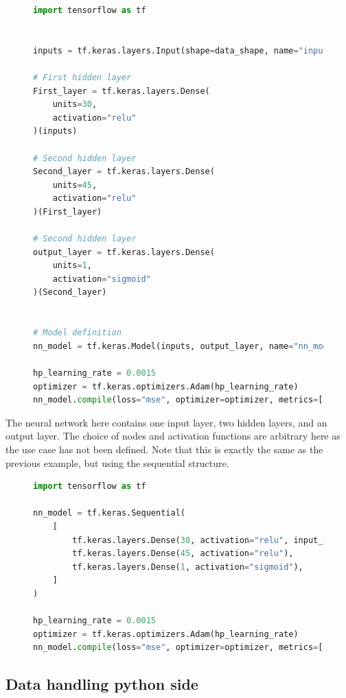 \begin{figure}[H]
    \centering
\begin{lstlisting}[language=Python, style=pythonstyle, label={code:python_func_example_general}]
import tensorflow as tf


inputs = tf.keras.layers.Input(shape=data_shape, name="input")

# First hidden layer
First_layer = tf.keras.layers.Dense(
    units=30,
    activation="relu"
)(inputs)

# Second hidden layer
Second_layer = tf.keras.layers.Dense(
    units=45, 
    activation="relu"
)(First_layer)

# Second hidden layer
output_layer = tf.keras.layers.Dense(
    units=1, 
    activation="sigmoid"
)(Second_layer)


# Model definition
nn_model = tf.keras.Model(inputs, output_layer, name="nn_model")

hp_learning_rate = 0.0015
optimizer = tf.keras.optimizers.Adam(hp_learning_rate)
nn_model.compile(loss="mse", optimizer=optimizer, metrics=["mse"]) 
\end{lstlisting}
\end{figure}
The neural network here contains one input layer, two hidden layers, and an output layer. The choice of nodes and activation functions are 
arbitrary here as the use case has not been defined. Note that this is exactly the same as the previous example, but using the sequential structure.

\begin{figure}[H]
    \centering
\begin{lstlisting}[language=Python, style=pythonstyle, label={code:python_seq_example}]
import tensorflow as tf

nn_model = tf.keras.Sequential(
    [
        tf.keras.layers.Dense(30, activation="relu", input_shape=data_shape),
        tf.keras.layers.Dense(45, activation="relu"),
        tf.keras.layers.Dense(1, activation="sigmoid"),
    ]
)

hp_learning_rate = 0.0015
optimizer = tf.keras.optimizers.Adam(hp_learning_rate)
nn_model.compile(loss="mse", optimizer=optimizer, metrics=["mse"]) 
\end{lstlisting}
\end{figure}

\subsection*{Data handling python side}


